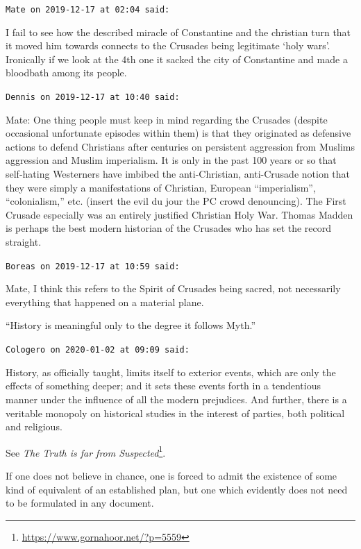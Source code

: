 \begin{footnotesize}
\begin{sffamily}
\texttt{Mate on 2019-12-17 at 02:04 said:}

I fail to see how the described miracle of Constantine and the christian turn that it moved him towards connects to the Crusades being legitimate `holy wars'. Ironically if we look at the 4th one it sacked the city of Constantine and made a bloodbath among its people.

\hfill

\texttt{Dennis on 2019-12-17 at 10:40 said:}

Mate: One thing people must keep in mind regarding the Crusades (despite occasional unfortunate episodes within them) is that they originated as defensive actions to defend Christians after centuries on persistent aggression from Muslims aggression and Muslim imperialism. It is only in the past 100 years or so that self-hating Westerners have imbibed the anti-Christian, anti-Crusade notion that they were simply a manifestations of Christian, European ``imperialism'', ``colonialism,'' etc. (insert the evil du jour the PC crowd denouncing). The First Crusade especially was an entirely justified Christian Holy War. Thomas Madden is perhaps the best modern historian of the Crusades who has set the record straight.

\hfill

\texttt{Boreas on 2019-12-17 at 10:59 said:}

Mate, I think this refers to the Spirit of Crusades being sacred, not necessarily everything that happened on a material plane.

``History is meaningful only to the degree it follows Myth.''

\hfill

\texttt{Cologero on 2020-01-02 at 09:09 said:}

History, as officially taught, limits itself to exterior events, which are only the effects of something deeper; and it sets these events forth in a tendentious manner under the influence of all the modern prejudices. And further, there is a veritable monopoly on historical studies in the interest of parties, both political and religious.

See \textit{The Truth is far from Suspected}\footnote{\url{https://www.gornahoor.net/?p=5559}}.

If one does not believe in chance, one is forced to admit the existence of some kind of equivalent of an established plan, but one which evidently does not need to be formulated in any document.

\hfill

\end{sffamily}
\end{footnotesize}

